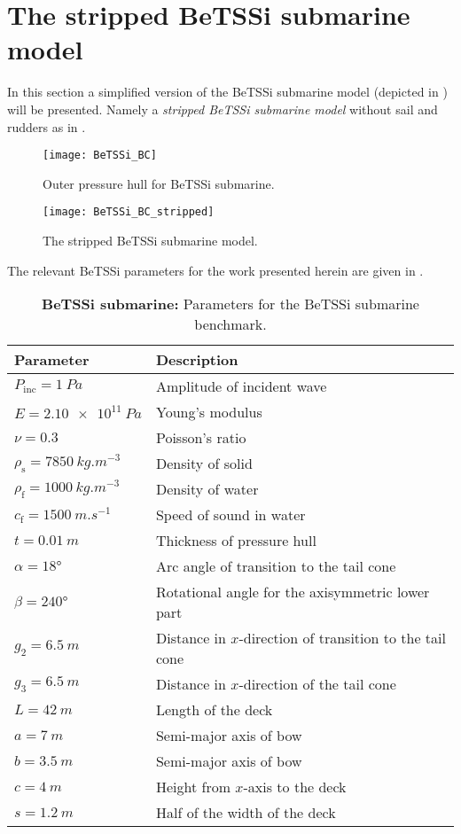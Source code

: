 \section{The stripped BeTSSi submarine model}
\label{Sec2:BeTSSi_description}
In this section a simplified version of the BeTSSi submarine model (depicted in ) will be presented. Namely a \textit{stripped BeTSSi submarine model} without sail and rudders as in .
\begin{figure}
	\centering
	\texttt{[image: BeTSSi\_BC]}
	\caption{Outer pressure hull for BeTSSi submarine.}
	\label{Fig2:BeTSSi_BC}
\end{figure}
\begin{figure}
	\centering
	\texttt{[image: BeTSSi\_BC\_stripped]}
	\caption{The stripped BeTSSi submarine model.}
	\label{Fig2:BeTSSi_BC_stripped}
\end{figure}
The relevant BeTSSi parameters for the work presented herein are given in .
\begin{table}
	\centering
	\caption{\textbf{BeTSSi submarine:} Parameters for the BeTSSi submarine benchmark.}
	\label{Tab2:BeTSSiParameters}
	\begin{tabular}{l l}
		\toprule
		Parameter & Description\\
		\midrule
		$P_{\mathrm{inc}}=\SI{1}{Pa}$ & Amplitude of incident wave\\
		$E = \SI{2.10e11}{Pa}$ & Young's modulus\\
		$\nu = 0.3$ & Poisson's ratio\\
		$\rho_{\mathrm{s}} = \SI{7850}{kg.m^{-3}}$ & Density of solid\\
		$\rho_{\mathrm{f}} = \SI{1000}{kg.m^{-3}}$ & Density of water\\
		$c_{\mathrm{f}} = \SI{1500}{m.s^{-1}}$ & Speed of sound in water\\
		$t=\SI{0.01}{m}$ & Thickness of pressure hull\\
		$\alpha=\ang{18}$ & Arc angle of transition to the tail cone\\
		$\beta=\ang{240}$ & Rotational angle for the axisymmetric lower part\\
		$g_2=\SI{6.5}{m}$ & Distance in $x$-direction of transition to the tail cone\\
		$g_3=\SI{6.5}{m}$ & Distance in $x$-direction of the tail cone\\
		$L=\SI{42}{m}$ & Length of the deck\\
		$a=\SI{7}{m}$ & Semi-major axis of bow\\
		$b=\SI{3.5}{m}$ & Semi-major axis of bow\\
		$c=\SI{4}{m}$ & Height from $x$-axis to the deck\\
		$s=\SI{1.2}{m}$ & Half of the width of the deck\\
		\bottomrule
	\end{tabular}
\end{table}

